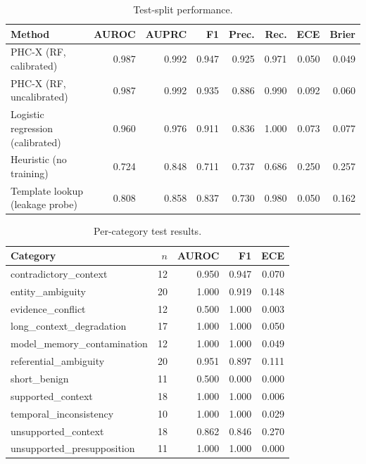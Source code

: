 \begin{table}[t]
\centering
\caption{Test-split performance.}
\label{tab:main}
\small
\begin{tabular}{lrrrrrrr}
\toprule
Method & AUROC & AUPRC & F1 & Prec. & Rec. & ECE & Brier \\
\midrule
PHC-X (RF, calibrated) & 0.987 & 0.992 & 0.947 & 0.925 & 0.971 & 0.050 & 0.049 \\
PHC-X (RF, uncalibrated) & 0.987 & 0.992 & 0.935 & 0.886 & 0.990 & 0.092 & 0.060 \\
Logistic regression (calibrated) & 0.960 & 0.976 & 0.911 & 0.836 & 1.000 & 0.073 & 0.077 \\
Heuristic (no training) & 0.724 & 0.848 & 0.711 & 0.737 & 0.686 & 0.250 & 0.257 \\
Template lookup (leakage probe) & 0.808 & 0.858 & 0.837 & 0.730 & 0.980 & 0.050 & 0.162 \\
\bottomrule
\end{tabular}
\end{table}
\begin{table}[t]
\centering
\caption{Per-category test results.}
\label{tab:category}
\small
\begin{tabular}{lrrrr}
\toprule
Category & $n$ & AUROC & F1 & ECE \\
\midrule
contradictory\_context & 12 & 0.950 & 0.947 & 0.070 \\
entity\_ambiguity & 20 & 1.000 & 0.919 & 0.148 \\
evidence\_conflict & 12 & 0.500 & 1.000 & 0.003 \\
long\_context\_degradation & 17 & 1.000 & 1.000 & 0.050 \\
model\_memory\_contamination & 12 & 1.000 & 1.000 & 0.049 \\
referential\_ambiguity & 20 & 0.951 & 0.897 & 0.111 \\
short\_benign & 11 & 0.500 & 0.000 & 0.000 \\
supported\_context & 18 & 1.000 & 1.000 & 0.006 \\
temporal\_inconsistency & 10 & 1.000 & 1.000 & 0.029 \\
unsupported\_context & 18 & 0.862 & 0.846 & 0.270 \\
unsupported\_presupposition & 11 & 1.000 & 1.000 & 0.000 \\
\bottomrule
\end{tabular}
\end{table}
